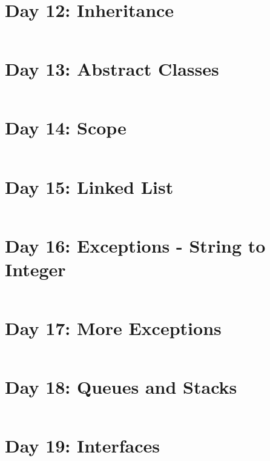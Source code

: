 \documentclass[11pt,a4paper]{article}
\begin{document}
\newpage
\section{Day 12: Inheritance}
\begin{lstlisting}
\end{lstlisting}

\newpage
\section{Day 13: Abstract Classes}
\begin{lstlisting}
\end{lstlisting}

\newpage
\section{Day 14: Scope}
\begin{lstlisting}
\end{lstlisting}

\newpage
\section{Day 15: Linked List}
\begin{lstlisting}
\end{lstlisting}

\newpage
\section{Day 16: Exceptions - String to Integer}
\begin{lstlisting}
\end{lstlisting}

\newpage
\section{Day 17: More Exceptions}
\begin{lstlisting}
\end{lstlisting}

\newpage
\section{Day 18: Queues and Stacks}
\begin{lstlisting}
\end{lstlisting}

\newpage
\section{Day 19: Interfaces}
\begin{lstlisting}
\end{lstlisting}
\end{document}
